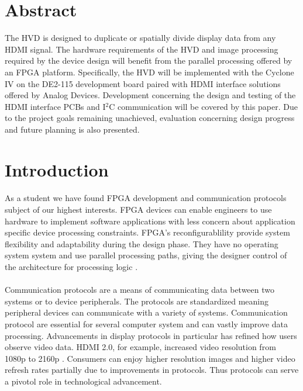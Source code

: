 \documentclass[pdftex,12pt,a4paper]{article}
\begin{document}


\pagebreak
\tableofcontents
\pagebreak

\section{Abstract}
The HVD is designed to duplicate or spatially divide display data from any HDMI signal. The hardware requirements of the HVD and image processing required by the device design will benefit from the parallel processing offered by an FPGA platform\cite{TechDoc_FPGA_Benefits}.  Specifically, the HVD will be implemented with the Cyclone IV on the DE2-115 development board paired with HDMI interface solutions offered by Analog Devices\cite{DataSheet_ADV7611, DataSheet_ADV7513, Guide_ADV7611, Guide_ADV7513}. Development concerning the design and testing of the HDMI interface PCBs and I$^2$C communication will be covered by this paper. Due to the project goals remaining unachieved, evaluation concerning design progress and future planning is also presented. 

\section{Introduction}

\paragraph{}
As a student we have found FPGA development and communication protocols subject of our highest interests. FPGA devices can enable engineers to use hardware to implement software applications with less concern about application specific device processing constraints. FPGA's reconfigurablility provide system flexibility and adaptability during the design phase. They have no operating system system and use parallel processing paths, giving the designer control of the architecture for processing logic \cite{TechDoc_FPGA_Benefits}.

\paragraph{}
Communication protocols are a means of communicating data between two systems or to device peripherals. The protocols are standardized meaning peripheral devices can communicate with a variety of systems. Communication protocol are essential for several computer system and can vastly improve data processing. Advancements in display protocols in particular has refined how users observe video data. HDMI 2.0, for example, increased video resolution from 1080p to 2160p \cite{Web_HDMI_2.0}. Consumers can enjoy higher resolution images and higher video refresh rates partially due to improvements in protocols. Thus protocols can serve a pivotol role in technological advancement. 
\end{document}

